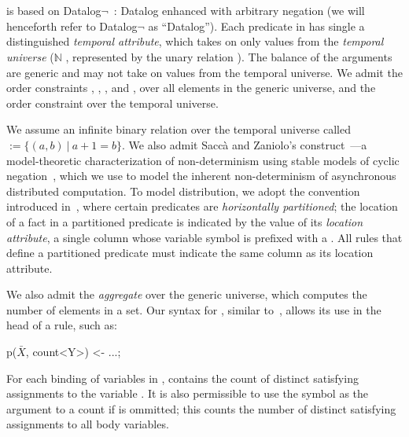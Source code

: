 \section{\large \bf \lang}
\label{sec:slang}

\lang is based on Datalog$\lnot$~\cite{ullmanbook}: Datalog enhanced with arbitrary negation (we will henceforth refer to Datalog$\lnot$ as ``Datalog'').  Each predicate in \lang has single a distinguished {\em temporal attribute}, which takes on only values from the {\em temporal universe} ($\mathbb{N}$ 
, represented by the unary relation ).
The balance of the arguments are generic and may not take on values from the temporal universe.  We admit the order constraints \dedalus{<}, \dedalus{=}, \dedalus{!=}, and \dedalus{<=}, over all elements in the generic universe, and the order constraint \dedalus{<} over the temporal universe.

We assume an infinite binary relation over the temporal universe
called  $:= \{(a,b) \ | \ a + 1 = b\}$.  We also admit Sacc\`{a} and Zaniolo's  construct~\cite{sacca-zaniolo}---a model-theoretic characterization of non-determinism using stable models of cyclic negation~\cite{stable-model}, which we use to model the inherent non-determinism of asynchronous distributed computation.  To model distribution, we adopt the convention introduced in~\cite{Loo:2005}, where certain predicates are {\em horizontally partitioned};  the location of a fact in a partitioned predicate is indicated by the value of its {\em location attribute}, a single column whose variable symbol is prefixed with a \dedalus{\#}.  All rules that define a partitioned predicate must indicate the same column as its location attribute.

We also admit the  {\em aggregate} over the generic universe, which computes the number of elements in a set.  Our syntax for , similar to~\cite{datalog-agg}, allows its use in the head of a rule, such as:

\begin{Dedalus}
p(\(\bar{X}\), count<Y>) <- ...;
\end{Dedalus}

For each binding of variables in ,  contains the count of distinct satisfying assignments to the variable .  It is also permissible to use the symbol \dedalus{*} as the argument to a count if  is ommitted; this counts the number of distinct satisfying assignments to all body variables.

